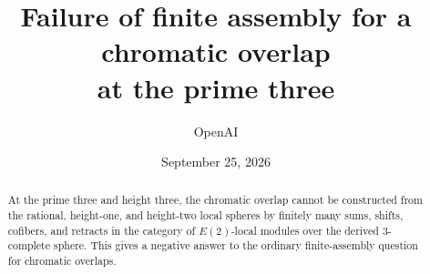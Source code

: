 \documentclass[11pt]{article}
\title{Failure of finite assembly for a chromatic overlap\\
at the prime three}
\author{OpenAI}
\date{September 25, 2026}
\theoremstyle{definition}
\numberwithin{equation}{section}
\begin{document}
\maketitle
\begin{abstract}
At the prime three and height three, the chromatic overlap cannot be
constructed from the rational, height-one, and height-two local spheres by
finitely many sums, shifts, cofibers, and retracts in the category of
\(E(2)\)-local modules over the derived 3-complete sphere. This gives a
negative answer to the ordinary finite-assembly question for chromatic
overlaps.
\end{abstract}

\begingroup
\setcounter{tocdepth}{1}
\small\tableofcontents
\endgroup











\begingroup
{}


\endgroup
\end{document}
